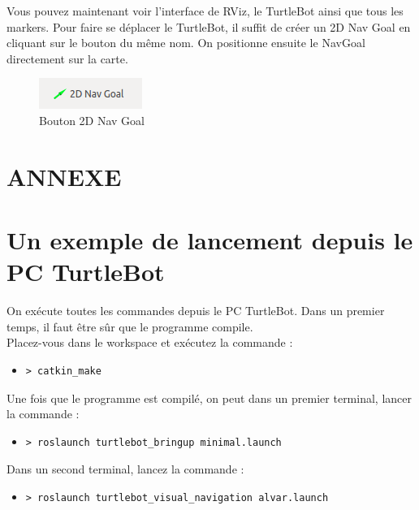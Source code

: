 \documentclass[10pt,a4paper]{article}
\begin{document}
Vous pouvez maintenant voir l'interface de RViz, le TurtleBot ainsi que tous les markers.
Pour faire se déplacer le TurtleBot, il suffit de créer un 2D Nav Goal en cliquant sur le bouton du même nom. On positionne ensuite le NavGoal directement sur la carte.\\
\begin{figure}[!h]
  \centering
  \noindent\includegraphics[scale=0.5]{2DNavGoal.png} 
  \caption{Bouton 2D Nav Goal}
\end{figure}


\newpage
\section*{ANNEXE}

\section{Un exemple de lancement depuis le PC TurtleBot}

On exécute toutes les commandes depuis le PC TurtleBot.
Dans un premier temps, il faut être sûr que le programme compile. \\
Placez-vous dans le workspace et exécutez la commande :
\begin{itemize}
\item[] \begin{verbatim}> catkin_make \end{verbatim}
\end{itemize}

Une fois que le programme est compilé, on peut dans un premier terminal, lancer la commande :
\begin{itemize}
\item[] \begin{verbatim}> roslaunch turtlebot_bringup minimal.launch \end{verbatim}
\end{itemize}

Dans un second terminal, lancez la commande :
\begin{itemize}
\item[] \begin{verbatim}> roslaunch turtlebot_visual_navigation alvar.launch \end{verbatim}
\end{itemize}
\end{document}
